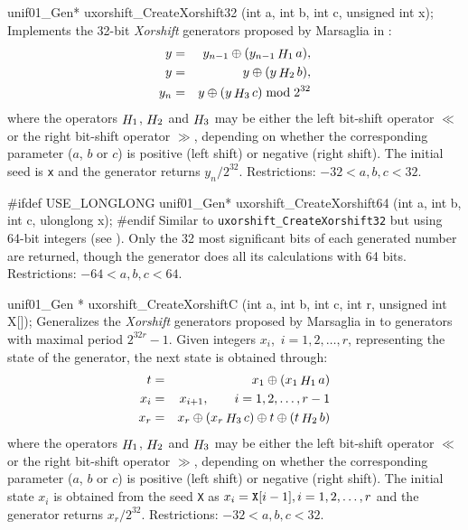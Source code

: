 unif01_Gen* uxorshift_CreateXorshift32 (int a, int b, int c, unsigned int x);
\endcode
 \tab Implements the 32-bit {\it Xorshift} generators
   proposed by Marsaglia in \cite[page 3]{rMAR03a}: \label{marsa-xorshift}
  \begin {eqnarray*}
   y &=& y_{n-1} \oplus (y_{n-1} \mathop {H}\nolimits_1 a), \\
   y &=& y \oplus (y \mathop {H}\nolimits_2 b), \\
   y_{n} &=& y \oplus (y \mathop {H}\nolimits_3 c) \bmod 2^{32}
  \end {eqnarray*}
%
   where the operators $\mathop {H}\nolimits_1$, $\mathop {H}\nolimits_2$ and $\mathop {H}\nolimits_3$ may be either
   the left bit-shift  operator $\ll$ or the right bit-shift operator $\gg$,
   depending on whether the corresponding parameter ($a$, $b$ or $c$) 
   is positive (left shift) or  negative (right shift).
   The initial seed is {\tt x} and the generator returns $y_{n}/2^{32}$.
   Restrictions: $-32 < a, b, c < 32$.
  \endtab
\code


#ifdef USE_LONGLONG
  unif01_Gen* uxorshift_CreateXorshift64 (int a, int b, int c, ulonglong x);
#endif
\endcode
 \tab  Similar to {\tt uxorshift\_CreateXorshift32} but using 64-bit integers
 (see \cite[page 3]{rMAR03a}).
  Only the 32 most significant bits of each 
  generated number are returned, though the generator does
  all its calculations with 64 bits.   Restrictions: $-64 < a, b, c < 64$.
  \endtab
\code


unif01_Gen * uxorshift_CreateXorshiftC (int a, int b, int c, int r,
                                        unsigned int X[]);
\endcode
 \tab Generalizes the {\it Xorshift} generators
  proposed by Marsaglia in \cite[page 4]{rMAR03a} to generators
  with maximal period  $2^{32r} - 1$.
  Given integers $x_i$,\  $i = 1,2,\ldots, r$,
   representing the state of the generator, the next
  state is obtained through:
  \begin {eqnarray*}
    t  &= & x_1 \oplus (x_1 \mathop {H}\nolimits_1 a) \\
    x_i &=& x_{i+1}, \qquad i = 1,2,\ldots, r-1 \\
    x_r   &=& x_r \oplus (x_r \mathop {H}\nolimits_3 c) \oplus t \oplus (t \mathop {H}\nolimits_2 b)
  \end {eqnarray*}
   where the operators $\mathop {H}\nolimits_1$, $\mathop {H}\nolimits_2$ and $\mathop {H}\nolimits_3$ may be either
   the left bit-shift  operator $\ll$ or the right bit-shift operator $\gg$,
   depending on whether the corresponding parameter ($a$, $b$ or $c$) 
   is positive (left shift) or  negative (right shift).
   The initial state $x_i$ is obtained from the seed {\tt X} as
    $x_i = {\tt X} [i - 1],   i = 1,2,\ldots, r$ and 
   the generator returns $x_{r}/2^{32}$.
   Restrictions: $-32 < a, b, c < 32$.
  \endtab
\code


